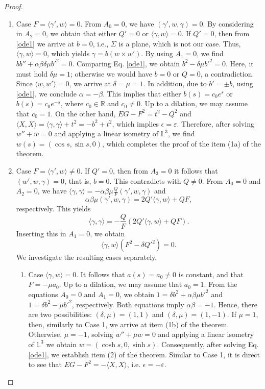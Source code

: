 \documentclass[a4paper,12pt]{amsart}
\theoremstyle{definition}
\def\r{\mathbb R}
\def\l{\mathbb L}
\begin{document}
\begin{proof}
\begin{enumerate}
\item  Case $F=\langle \gamma',w \rangle =0$. From $A_0=0$, we have $(\gamma',w,\gamma)=0$. By considering in $A_2=0$, we obtain that either $Q'=0$ or $\langle \gamma,w \rangle =0$. If $Q'=0$, then from \eqref{ode1} we arrive at $b=0$, i.e., $\Sigma$ is a plane, which is not our case. Thus,   $\langle \gamma,w \rangle =0$, which yields   $\gamma=b (w\times w')$. By using $A_1=0$, we find $bb''+\alpha \beta\delta\mu b'^2=0$. Comparing Eq. \eqref{ode1}, we obtain $b^2-\delta\mu b'^2=0$. Here, it must hold $\delta\mu=1$; otherwise we would have $b=0$ or $Q=0$, a contradiction. Since $\langle w,w'\rangle =0$, we arrive at $\delta=\mu=1.$ In addition, due to $b'=\pm b$, using \eqref{ode1}, we conclude $\alpha=-\beta$. This implies that either $b(s)=c_0e^s$ or $b(s)=c_0e^{-s}$, where $c_0 \in \r$ and $c_0 \neq 0$. Up to a dilation, we may assume that $c_0=1$. On the other hand, $EG-F^2=t^2-Q^2$ and $\langle X,X\rangle=\langle \gamma,\gamma\rangle+t^2=-b^2+t^2$, which implies $\epsilon=\varepsilon$. Therefore, after solving $w''+w=0$ and applying a linear isometry of $\l^3$, we find $w(s)=(\cos s, \sin s, 0)$, which completes the proof of the item (1a) of the theorem.

\item Case $F=\langle \gamma',w \rangle \neq 0$. If $Q'=0$, then from $A_3=0$ it follows that $(w',w,\gamma)=0$, that is, $b=0.$ This contradicts with $Q\neq 0$. From $A_0=0$ and $A_2=0$, we have $\langle \gamma, \gamma \rangle=-\alpha\beta\mu\frac{Q}{F}(\gamma',w,\gamma)$ and 
\begin{equation*}
\alpha\beta\mu(\gamma',w,\gamma)=2Q'\langle \gamma, w \rangle+QF,
\end{equation*}
respectively. This yields   
\begin{equation}
\langle \gamma, \gamma \rangle=-\frac{Q}{F}(2Q'\langle \gamma, w \rangle+QF). \label{qf}
\end{equation}
Inserting this in $A_1=0$, we obtain 
$$\langle \gamma, w \rangle (F^2-\delta Q'^2)=0.$$ 
We investigate the resulting cases separately.

\begin{enumerate}
\item Case $\langle \gamma, w \rangle = 0$. It follows that $a(s)=a_0\not=0$ is constant, and that $F = -\mu a_0$. Up to a dilation, we may assume that $a_0=1$. From the equations $A_0 = 0$ and $A_1=0$, we obtain $1= \delta b^2 + \alpha \beta \mu b'^2$  and $1= \delta b^2 - \mu b'^2$, respectively. Both equations imply  $\alpha \beta = -1$. Hence, there are two possibilities: $(\delta,\mu)=(1,1)$ and $(\delta,\mu)=(1,-1)$. If $\mu=1$, then, similarly to Case 1, we arrive at item (1b) of the theorem. Otherwise, $\mu=-1$,  solving $w''+\mu w=0$ and applying a linear isometry of $\l^3$ we obtain $w=(\cosh s, 0 , \sinh s).$ Consequently, after solving Eq.  \eqref{ode1}, we establish item (2) of the theorem. Similar to Case 1, it is direct to see that $EG-F^2=-\langle X,X\rangle$, i.e. $\epsilon=-\varepsilon$.


\end{enumerate}
\end{enumerate}
\end{proof}
\end{document}
